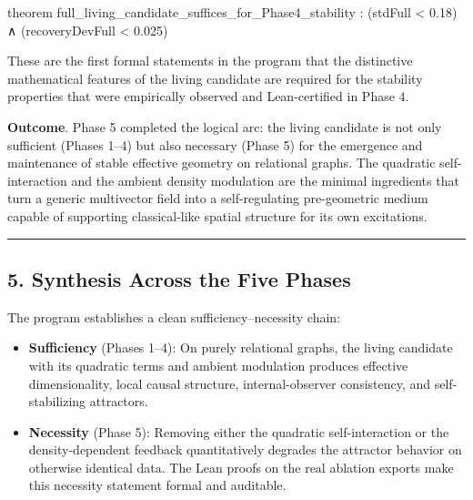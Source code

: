 \documentclass[
  11pt,
  a4paper,
]{article}
\newenvironment{Shaded}{\begin{snugshade}}{\end{snugshade}}
\newcommand{\NormalTok}[1]{#1}
\providecommand{\tightlist}{%
  \setlength{\itemsep}{0pt}\setlength{\parskip}{0pt}}
\begin{document}
\begin{Shaded}
\begin{Highlighting}[]
\NormalTok{theorem full\_living\_candidate\_suffices\_for\_Phase4\_stability :}
\NormalTok{    (stdFull \textless{} 0.18) ∧ (recoveryDevFull \textless{} 0.025)}
\end{Highlighting}
\end{Shaded}

These are the first formal statements in the program that the
distinctive mathematical features of the living candidate are required
for the stability properties that were empirically observed and
Lean-certified in Phase 4.

\textbf{Outcome}. Phase 5 completed the logical arc: the living
candidate is not only sufficient (Phases 1--4) but also necessary (Phase
5) for the emergence and maintenance of stable effective geometry on
relational graphs. The quadratic self-interaction and the ambient
density modulation are the minimal ingredients that turn a generic
multivector field into a self-regulating pre-geometric medium capable of
supporting classical-like spatial structure for its own excitations.

\begin{center}\rule{0.5\linewidth}{0.5pt}\end{center}

\subsection{5. Synthesis Across the Five
Phases}\label{synthesis-across-the-five-phases}

The program establishes a clean sufficiency--necessity chain:

\begin{itemize}
\tightlist
\item
  \textbf{Sufficiency} (Phases 1--4): On purely relational graphs, the
  living candidate with its quadratic terms and ambient modulation
  produces effective dimensionality, local causal structure,
  internal-observer consistency, and self-stabilizing attractors.
\item
  \textbf{Necessity} (Phase 5): Removing either the quadratic
  self-interaction or the density-dependent feedback quantitatively
  degrades the attractor behavior on otherwise identical data. The Lean
  proofs on the real ablation exports make this necessity statement
  formal and auditable.
\end{itemize}
\end{document}
